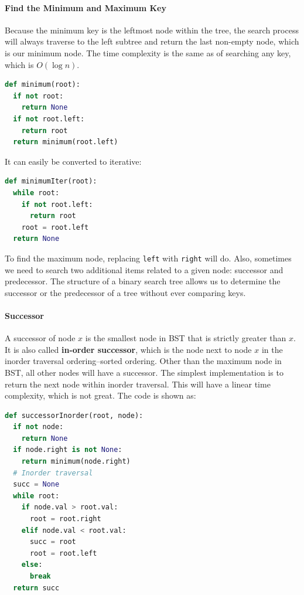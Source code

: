 \documentclass[main.tex]{subfiles}
\begin{document}
\paragraph{Find the Minimum and Maximum Key} Because the minimum key is the leftmost node within the tree, the search process will always traverse to the left subtree and return the last non-empty node, which is our minimum node.  The time complexity is the same as of searching any key, which is $O(\log n)$.
\begin{lstlisting}[language=Python]
def minimum(root):
  if not root:
    return None
  if not root.left:
    return root
  return minimum(root.left)
\end{lstlisting}
It can easily be converted to iterative:
\begin{lstlisting}[language=Python]
def minimumIter(root):
  while root:
    if not root.left:
      return root
    root = root.left
  return None
\end{lstlisting}
To find the maximum node, replacing \texttt{left} with \texttt{right} will do. 
Also, sometimes we need to search two additional items related to a given node:  successor and predecessor. The structure of a binary search tree allows us to determine the successor or the predecessor of a tree without ever comparing keys. 

\paragraph{Successor}  A successor of node $x$ is the smallest node in BST that is strictly greater than $x$. It is also called \textbf{in-order successor}, which is the node next to node $x$ in the inorder traversal ordering--sorted ordering. Other than the maximum node in BST, all other nodes will have a successor. The simplest implementation is to return the next node within inorder traversal. This will have a linear time complexity, which is not great. The code is shown as:
\begin{lstlisting}[language=Python]
def successorInorder(root, node):
  if not node:
    return None
  if node.right is not None:
    return minimum(node.right)
  # Inorder traversal
  succ = None
  while root:      
    if node.val > root.val:
      root = root.right
    elif node.val < root.val:
      succ = root
      root = root.left
    else:
      break
  return succ
\end{lstlisting}
\end{document}
